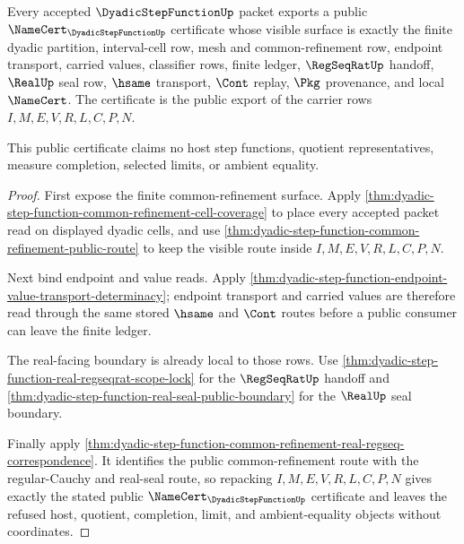 \begin{theorem}
\label{thm:dyadic-step-function-public-certificate}
Every accepted $\DyadicStepFunctionUp$ packet exports a public $\NameCert_{\DyadicStepFunctionUp}$ certificate whose visible surface is exactly the finite dyadic partition, interval-cell row, mesh and common-refinement row, endpoint transport, carried values, classifier rows, finite ledger, $\RegSeqRatUp$ handoff, $\RealUp$ seal row, $\hsame$ transport, $\Cont$ replay, $\Pkg$ provenance, and local $\NameCert$. The certificate is the public export of the carrier rows $I,M,E,V,R,L,C,P,N$.

This public certificate claims no host step functions, quotient representatives, measure completion, selected limits, or ambient equality.
\end{theorem}
\begin{proof}
First expose the finite common-refinement surface. Apply \autoref{thm:dyadic-step-function-common-refinement-cell-coverage} to place every accepted packet read on displayed dyadic cells, and use \autoref{thm:dyadic-step-function-common-refinement-public-route} to keep the visible route inside $I,M,E,V,R,L,C,P,N$.

Next bind endpoint and value reads. Apply \autoref{thm:dyadic-step-function-endpoint-value-transport-determinacy}; endpoint transport and carried values are therefore read through the same stored $\hsame$ and $\Cont$ routes before a public consumer can leave the finite ledger.

The real-facing boundary is already local to those rows. Use \autoref{thm:dyadic-step-function-real-regseqrat-scope-lock} for the $\RegSeqRatUp$ handoff and \autoref{thm:dyadic-step-function-real-seal-public-boundary} for the $\RealUp$ seal boundary.

Finally apply \autoref{thm:dyadic-step-function-common-refinement-real-regseq-correspondence}. It identifies the public common-refinement route with the regular-Cauchy and real-seal route, so repacking $I,M,E,V,R,L,C,P,N$ gives exactly the stated public $\NameCert_{\DyadicStepFunctionUp}$ certificate and leaves the refused host, quotient, completion, limit, and ambient-equality objects without coordinates.
\end{proof}

